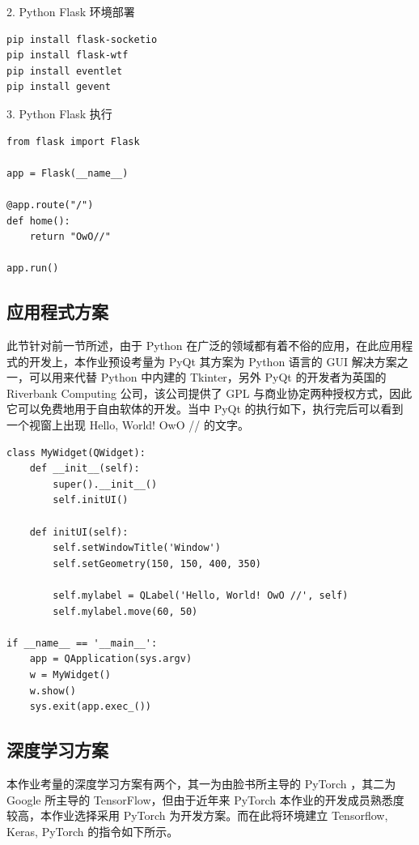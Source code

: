 2. Python Flask 环境部署

\begin{Verbatim}
pip install flask-socketio
pip install flask-wtf
pip install eventlet
pip install gevent
\end{Verbatim}

3. Python Flask 执行

\begin{Verbatim}
from flask import Flask

app = Flask(__name__)

@app.route("/")
def home():
    return "OwO//"

app.run()
\end{Verbatim}



\subsection{应用程式方案}

此节针对前一节所述，由于 Python 在广泛的领域都有着不俗的应用，在此应用程式的开发上，本作业预设考量为 PyQt 其方案为 Python 语言的 GUI 解决方案之一，可以用来代替 Python 中内建的 Tkinter，另外 PyQt 的开发者为英国的 Riverbank Computing 公司，该公司提供了 GPL 与商业协定两种授权方式，因此它可以免费地用于自由软体的开发。当中 PyQt 的执行如下，执行完后可以看到一个视窗上出现 Hello, World! OwO // 的文字。

\begin{Verbatim}
class MyWidget(QWidget):
    def __init__(self):
        super().__init__()
        self.initUI()

    def initUI(self):
        self.setWindowTitle('Window')
        self.setGeometry(150, 150, 400, 350)

        self.mylabel = QLabel('Hello, World! OwO //', self)
        self.mylabel.move(60, 50)

if __name__ == '__main__':
    app = QApplication(sys.argv)
    w = MyWidget()
    w.show()
    sys.exit(app.exec_())
\end{Verbatim}


\subsection{深度学习方案}

本作业考量的深度学习方案有两个，其一为由脸书所主导的 PyTorch ，其二为 Google 所主导的 TensorFlow，但由于近年来 PyTorch 本作业的开发成员熟悉度较高，本作业选择采用 PyTorch 为开发方案。而在此将环境建立 Tensorflow, Keras, PyTorch 的指令如下所示。

